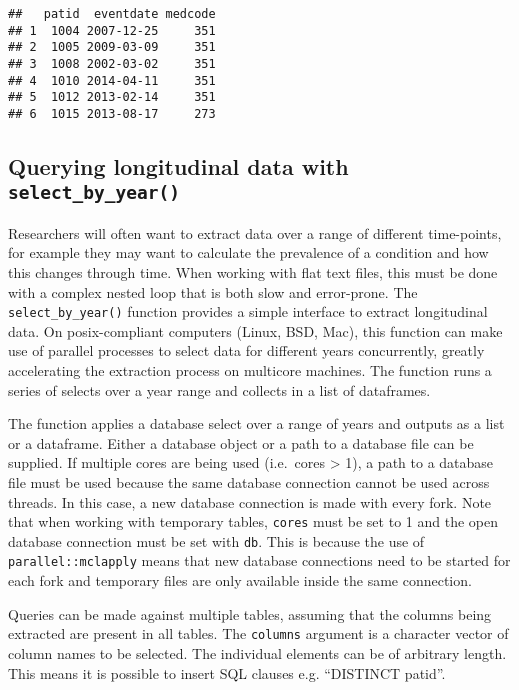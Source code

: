 \documentclass[]{article}
\begin{document}
\begin{verbatim}
##   patid  eventdate medcode
## 1  1004 2007-12-25     351
## 2  1005 2009-03-09     351
## 3  1008 2002-03-02     351
## 4  1010 2014-04-11     351
## 5  1012 2013-02-14     351
## 6  1015 2013-08-17     273
\end{verbatim}

\subsection{Querying longitudinal data with
\texttt{select\_by\_year()}}\label{querying-longitudinal-data-with-selectux5fbyux5fyear}

Researchers will often want to extract data over a range of different
time-points, for example they may want to calculate the prevalence of a
condition and how this changes through time. When working with flat text
files, this must be done with a complex nested loop that is both slow
and error-prone. The \texttt{select\_by\_year()} function provides a
simple interface to extract longitudinal data. On posix-compliant
computers (Linux, BSD, Mac), this function can make use of parallel
processes to select data for different years concurrently, greatly
accelerating the extraction process on multicore machines. The function
runs a series of selects over a year range and collects in a list of
dataframes.

The function applies a database select over a range of years and outputs
as a list or a dataframe. Either a database object or a path to a
database file can be supplied. If multiple cores are being used
(i.e.~cores \textgreater{} 1), a path to a database file must be used
because the same database connection cannot be used across threads. In
this case, a new database connection is made with every fork. Note that
when working with temporary tables, \texttt{cores} must be set to 1 and
the open database connection must be set with \texttt{db}. This is
because the use of \texttt{parallel::mclapply} means that new database
connections need to be started for each fork and temporary files are
only available inside the same connection.

Queries can be made against multiple tables, assuming that the columns
being extracted are present in all tables. The \texttt{columns} argument
is a character vector of column names to be selected. The individual
elements can be of arbitrary length. This means it is possible to insert
SQL clauses e.g. ``DISTINCT patid''.
\end{document}
